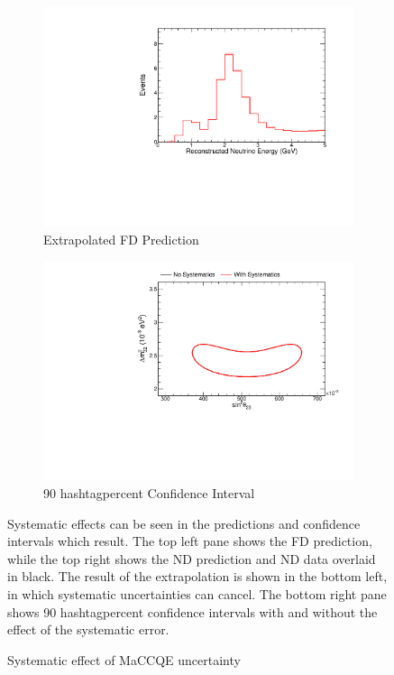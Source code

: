 {\begin{figure}
\begin{center}
\begin{subfigure}[c]{0.49\textwidth}
\includegraphics[width=\textwidth]{figures/systs/prediction/fd_extrap_prediction_MaCCQE.pdf}
\caption*{Extrapolated FD Prediction}
\end{subfigure}
\begin{subfigure}[c]{0.49\textwidth}
\includegraphics[width=\textwidth]{figures/systs/prediction/fd_extrap_contour_MaCCQE.pdf}
\caption*{90 hashtagpercent Confidence Interval}
\end{subfigure}
\end{center}
\caption{Systematic effect of MaCCQE uncertainty}{
Systematic effects can be seen in the predictions and confidence intervals
which result.
The top left pane shows the FD prediction, while the top right shows the
ND prediction and ND data overlaid in black.
The result of the extrapolation is shown in the bottom left, in which
systematic uncertainties can cancel.
The bottom right pane shows 90 hashtagpercent confidence intervals with and without
the effect of the systematic error.}
\label{syst_fig_MaCCQE}


\end{figure}}
